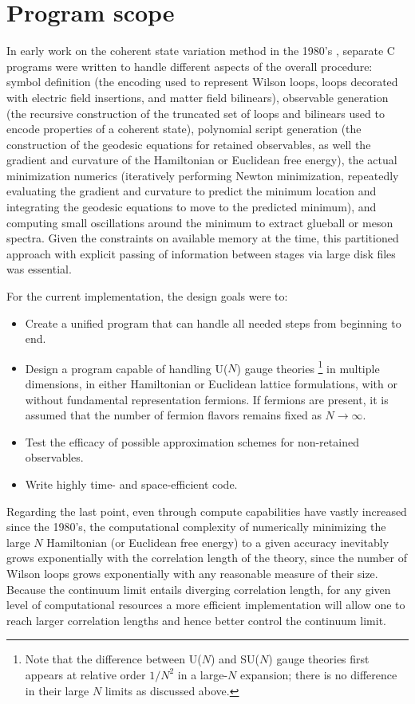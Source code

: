 \documentclass [12pt]{article}
\begin{document}
\section {Program scope}

In early work  on the coherent state variation method in the
1980's \cite{CSVAII},
separate C programs were written to handle different aspects
of the overall procedure:
symbol definition (the encoding used to represent Wilson loops,
loops decorated with electric field insertions,
and matter field bilinears),
observable generation
(the recursive construction of the truncated
set of loops and bilinears used to encode
properties of a coherent state),
polynomial script generation
(the construction of the geodesic equations
for retained observables, as well the gradient
and curvature of the Hamiltonian or Euclidean free energy),
the actual minimization numerics
(iteratively performing Newton minimization, repeatedly
evaluating the gradient and curvature to predict the minimum location
and integrating the geodesic equations to move to the
predicted minimum),
and computing small oscillations around the
minimum to extract glueball or meson spectra.
Given the constraints on available memory at the time,
this partitioned approach with explicit passing of
information between stages via large disk files was essential.

For the current implementation, the design goals were to:
\begin{itemize}\advance\itemsep -4pt
\item
    Create a unified program that can handle all needed
    steps from beginning to end.
\item
    Design a program capable of handling U($N$) gauge theories%
    \footnote
	{%
	Note that the difference between U($N$) and
	SU($N$) gauge theories first appears at relative
	order $1/N^2$ in a large-$N$ expansion;
	there is no difference in their large $N$ limits
	as discussed above.
	}
    in multiple dimensions,
    in either Hamiltonian or Euclidean lattice formulations,
    with or without fundamental representation fermions.
    If fermions are present, it is assumed that the
    number of fermion flavors remains fixed as $N \to \infty$.
\item
    Test the efficacy of possible approximation schemes for
    non-retained observables.
\item
    Write highly time- and space-efficient code.
\end{itemize}
Regarding the last point,
even through compute capabilities have vastly increased
since the 1980's,
the computational complexity of numerically
minimizing the large $N$ Hamiltonian (or Euclidean free energy)
to a given accuracy inevitably grows exponentially with the
correlation length of the theory, since the number of Wilson loops
grows exponentially with any reasonable measure of their size.
Because the continuum limit entails diverging
correlation length,
for any given level of computational resources
a more efficient implementation will allow one to
reach larger correlation lengths and hence
better control the continuum limit.
\end{document}
